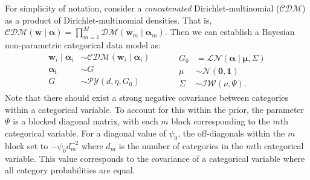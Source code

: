     For simplicity of notation, consider a \emph{concatenated} 
    Dirichlet-multinomial ($\mathcal{CDM}$) as a product of 
    Dirichlet-multinomial densities.  That is, 
    $\mathcal{CDM}(\bm{w}\mid\bm{\alpha}) = 
        \prod_{m = 1}^M\mathcal{DM}(\bm{w}_m\mid\bm{\alpha}_m)$.
    Then we can establish a Bayesian non-parametric categorical data model as:
    \begin{equation}
      \label{eqn:modelcat}
      \begin{aligned}
      \bm{w}_i \mid \bm{\alpha}_i &\sim 
        \mathcal{CDM}\left(\bm{w}_i\mid\bm{\alpha}_i\right)\\
      \bm{\alpha_i} &\sim G\\
      G &\sim \mathcal{PY}\left(d, \eta, G_0\right)\\
      \end{aligned}
      ~\hspace{1cm}
      \begin{aligned}
      G_0 &= \mathcal{LN}\left(\bm{\alpha}\mid\bm{\mu},\Sigma\right)\\
      \mu &\sim \mathcal{N}\left(\bm{0},\bm{1}\right)\\
      \Sigma &\sim \mathcal{IW}\left(\nu, \Psi\right).
      \end{aligned}
    \end{equation}
    Note that there should exist a strong negative covariance between categories 
    within a categorical variable.  To account for this within the prior, the 
    parameter $\Psi$ is a blocked diagonal matrix, with each $m$ block 
    corresponding to the $m$th categorical variable.  For a diagonal value of 
    $\psi_0$, the off-diagonals within the $m$ block set to $-\psi_0 d_m^{-2}$ 
    where $d_m$ is the number of categories in the $m$th categorical variable.
    This value corresponds to the covariance of a categorical variable where all 
    category probabilities are equal.

